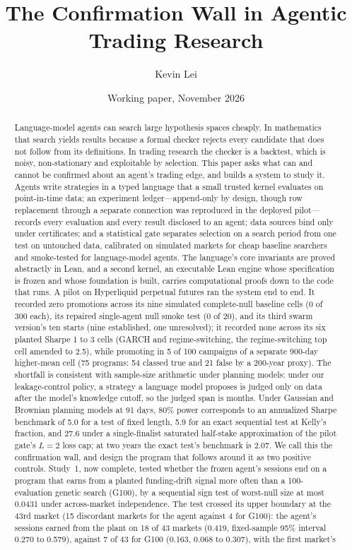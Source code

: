 \documentclass[11pt]{article}
\title{The Confirmation Wall in Agentic Trading Research}
\author{Kevin Lei}
\date{Working paper, November 2026}
\begin{document}
\maketitle

\begin{abstract}
Language-model agents can search large hypothesis spaces cheaply. In mathematics that search yields results because a formal checker rejects every candidate that does not follow from its definitions. In trading research the checker is a backtest, which is noisy, non-stationary and exploitable by selection. This paper asks what can and cannot be confirmed about an agent's trading edge, and builds a system to study it. Agents write strategies in a typed language that a small trusted kernel evaluates on point-in-time data; an experiment ledger---append-only by design, though row replacement through a separate connection was reproduced in the deployed pilot---records every evaluation and every result disclosed to an agent; data sources bind only under certificates; and a statistical gate separates selection on a search period from one test on untouched data, calibrated on simulated markets for cheap baseline searchers and smoke-tested for language-model agents. The language's core invariants are proved abstractly in Lean, and a second kernel, an executable Lean engine whose specification is frozen and whose foundation is built, carries computational proofs down to the code that runs. A pilot on Hyperliquid perpetual futures ran the system end to end. It recorded zero promotions across its nine simulated complete-null baseline cells (0 of 300 each), its repaired single-agent null smoke test (0 of 20), and its third swarm version's ten starts (nine established, one unresolved); it recorded none across its six planted Sharpe 1 to 3 cells (GARCH and regime-switching, the regime-switching top cell amended to 2.5), while promoting in 5 of 100 campaigns of a separate 900-day higher-mean cell (75 programs: 54 classed true and 21 false by a 200-year proxy). The shortfall is consistent with sample-size arithmetic under planning models: under our leakage-control policy, a strategy a language model proposes is judged only on data after the model's knowledge cutoff, so the judged span is months. Under Gaussian and Brownian planning models at 91 days, 80\% power corresponds to an annualized Sharpe benchmark of 5.0 for a test of fixed length, 5.9 for an exact sequential test at Kelly's fraction, and 27.6 under a single-finalist saturated half-stake approximation of the pilot gate's $L=2$ loss cap; at two years the exact test's benchmark is 2.07. We call this the confirmation wall, and design the program that follows around it as two positive controls. Study~1, now complete, tested whether the frozen agent's sessions end on a program that earns from a planted funding-drift signal more often than a 100-evaluation genetic search (G100), by a sequential sign test of worst-null size at most 0.0431 under across-market independence. The test crossed its upper boundary at the 43rd market (15 discordant markets for the agent against 4 for G100): the agent's sessions earned from the plant on 18 of 43 markets (0.419, fixed-sample 95\% interval 0.270 to 0.579), against 7 of 43 for G100 (0.163, 0.068 to 0.307), with the first market's 
\end{abstract}
\end{document}

